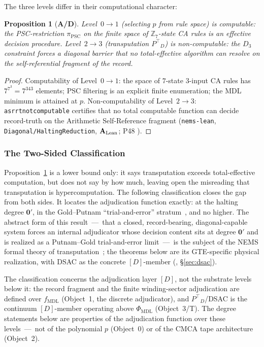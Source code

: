 \documentclass[11pt]{article}
\newtheorem{proposition}[theorem]{Proposition}
\theoremstyle{remark}
\newcommand{\PSC}{\text{PSC}}
\newcommand{\PHIMDL}{\ensuremath{\Phi_{\mathrm{MDL}}}}
\newcommand{\lean}[1]{%
  \penalty-100
  \begingroup\def\_{\textunderscore\allowbreak}\texttt{#1}\endgroup}
\newcommand{\fmdl}{\ensuremath{f_{\mathrm{MDL}}}}
\newcommand{\Ptop}{\ensuremath{P^{\top}}}
\newcommand{\CatAL}{\ensuremath{\textbf{A}_{\rm Lean}}}
\newcommand{\CatAD}{\textbf{A/D}}
\begin{document}
The three levels differ in their computational character:

\begin{proposition}[\CatAD]
\label{prop:comp_gap}
Level~$0\to1$ (selecting $p$ from rule space) is
\emph{computable}: the PSC-restriction $\pi_{\PSC}$ on the finite space
of $\mathbb{Z}_7$-state CA rules is an effective decision procedure.
Level~$2\to3$ (transputation $\Ptop_D$) is \emph{non-computable}: the
$D_3$ constraint forces a diagonal barrier that no total-effective
algorithm can resolve on the self-referential fragment of the record.
\end{proposition}

\begin{proof}
Computability of Level~$0\to1$: the space of $7$-state 3-input CA rules
has $7^{7^3} = 7^{343}$ elements; PSC filtering is an explicit finite
enumeration; the MDL minimum is attained at $p$.
Non-computability of Level~$2\to3$: \lean{asr\_rt\_not\_computable}
certifies that no total computable function can decide record-truth on
the Arithmetic Self-Reference fragment
(\texttt{nems-lean}, \texttt{Diagonal/HaltingReduction}, \CatAL; P48
\cite{SpivackGTECompleteFramework}).
\end{proof}

\subsubsection{The Two-Sided Classification}
\label{sec:two_sided}

Proposition~\ref{prop:comp_gap} is a lower bound only: it says transputation
exceeds total-effective computation, but does not say by how much, leaving
open the misreading that transputation is hypercomputation.
The following classification closes the gap from both sides.
It locates the adjudication function exactly: at the halting degree
$\mathbf{0}'$, in the Gold--Putnam ``trial-and-error''
stratum~\cite{Gold1965,Putnam1965}, and no higher.
The abstract form of this result~---~that a closed, record-bearing,
diagonal-capable system forces an internal adjudicator whose decision
content sits at degree $\mathbf{0}'$ and is realized as a Putnam--Gold
trial-and-error limit~---~is the subject of the NEMS formal theory of
transputation~\cite{SpivackNEMS76}; the theorems below are its
GTE-specific physical realization, with DSAC as the concrete $[D]$-member
(\cite{SpivackNEMS77}, \S\ref{sec:dsac}).

The classification concerns the adjudication layer $[D]$, not the substrate
levels below it: the record fragment and the finite winding-sector
adjudication are defined over \fmdl{} (Object~1, the discrete adjudicator),
and $\Ptop_D$/DSAC is the continuum $[D]$-member operating above $\PHIMDL$
(Object~3/T). The degree statements below are properties of the adjudication
function over these levels~---~not of the polynomial $p$ (Object~0) or of
the CMCA tape architecture (Object~2).
\end{document}
